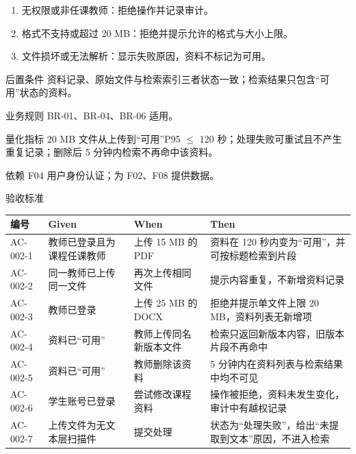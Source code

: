 \documentclass[12pt,a4paper]{ctexart}
\newenvironment{reqcard}
  {\begin{description}[leftmargin=6.2em,style=nextline,itemsep=4pt]}
  {\end{description}}
\begin{document}
\begin{reqcard}
\begin{enumerate}[label=E\arabic*,leftmargin=2.6em]
      \item 无权限或非任课教师：拒绝操作并记录审计。
      \item 格式不支持或超过 20 MB：拒绝并提示允许的格式与大小上限。
      \item 文件损坏或无法解析：显示失败原因，资料不标记为可用。
    \end{enumerate}
  \item[后置条件] 资料记录、原始文件与检索索引三者状态一致；检索结果只包含“可用”状态的资料。
  \item[业务规则] BR-01、BR-04、BR-06 适用。
  \item[量化指标] 20 MB 文件从上传到“可用”P95 $\leq$ 120 秒；处理失败可重试且不产生重复记录；删除后 5 分钟内检索不再命中该资料。
  \item[依赖] F04 用户身份认证；为 F02、F08 提供数据。
  \item[验收标准]
\end{reqcard}

\begin{longtable}{@{}C{2.1cm}L{4.2cm}L{4.4cm}L{4.0cm}@{}}
  \toprule
  \textbf{编号} & \textbf{Given} & \textbf{When} & \textbf{Then} \\
  \midrule
  \endhead
  AC-002-1 & 教师已登录且为课程任课教师 & 上传 15 MB 的 PDF & 资料在 120 秒内变为“可用”，并可按标题检索到片段 \\
  AC-002-2 & 同一教师已上传同一文件 & 再次上传相同文件 & 提示内容重复，不新增资料记录 \\
  AC-002-3 & 教师已登录 & 上传 25 MB 的 DOCX & 拒绝并提示单文件上限 20 MB，资料列表无新增项 \\
  AC-002-4 & 资料已“可用” & 教师上传同名新版本文件 & 检索只返回新版本内容，旧版本片段不再命中 \\
  AC-002-5 & 资料已“可用” & 教师删除该资料 & 5 分钟内在资料列表与检索结果中均不可见 \\
  AC-002-6 & 学生账号已登录 & 尝试修改课程资料 & 操作被拒绝，资料未发生变化，审计中有越权记录 \\
  AC-002-7 & 上传文件为无文本层扫描件 & 提交处理 & 状态为“处理失败”，给出“未提取到文本”原因，不进入检索 \\
  \bottomrule
\end{longtable}
\end{document}
